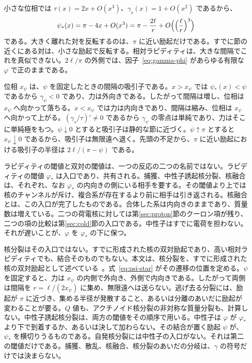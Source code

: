 \documentclass[a4paper]{article}
\begin{document}
小さな位相では \(\tau(x)=2x+O(x^{3})\)、\(\gamma_s(x)=1+O(x^{2})\) であるから、
\[
\psi_*(x)=\pi-4x+O(x^{3})=\pi-\frac{2\ell}{r}+O\Bigl(\Bigl(\frac{\ell}{r}\Bigr)^{3}\Bigr)
\]
である。大きく離れた対を反転するのは、\(\pi\) に近い励起だけである。すでに節の近くにある対は、小さな励起で反転する。相対ラピディティは、大きな間隔でこれを真似できない。\(2\ell/\pi\) の外側では、因子~\eqref{eq:gamma-phi} があらゆる有限な \(\varphi\) で正のままである。

位相 \(x_\psi\) は、\(\psi\) を固定したときの間隔の吸引子である。\(x>x_\psi\) では \(\psi_*(x)<\psi\) であるから \(\gamma_\psi<0\) であり、力は外向きである。したがって間隔は増し、位相は \(x_\psi\) へ向かって落ちる。\(x<x_\psi\) では力は内向きであり、間隔は縮み、位相は \(x_\psi\) へ向かって上がる。\((\gamma_s/\tau)'\neq 0\) であるから \(\gamma_\psi\) の零点は単純であり、力はそこに単純極をもつ。\(\psi\downarrow 0\) とすると吸引子は静的な節に近づく。\(\psi\uparrow\pi\) とすると \(x_\psi\downarrow 0\) であるから、吸引子は無限遠へ退く。先頭の不足から、\(\pi\) に近い励起における吸引子の半径は \(2\ell/(\pi-\psi)\) である。

ラピディティの閾値と双対の閾値は、一つの反応の二つの名前ではない。ラピディティの閾値 \(\varphi_*\) は入口であり、共有される。捕獲、中性子誘起核分裂、核融合は、それぞれ、なお \(\varphi_*\) の内向きの側にいる相手を要する。その閾値より上では核のチャンネルが斥け、複合系が存在するより前に相手は引き返される。核融合とは、この入口が完了したものである。合体した系は内向きのままであり、質量数は増えている。二つの荷電核に対しては第\ref{sec:proton}節のクーロン項が残り、二つの項の比較は第\ref{sec:cold}節の入口である。中性子はすでに電荷を担わない。それが遅いことが、\(\varphi\) を \(\varphi_*\) の下に保つ。

核分裂はその入口ではない。すでに形成された核の双対励起であり、高い相対ラピディティでも、結合そのものでもない。本文は、核分裂を、すでに形成された核の双対励起として述べている~\cite{dst-main}。式~\eqref{eq:psi-star} がその遷移の位置を定める。\(\psi\) を固定すると、力は \(x_\psi\) の内側で外向き、外側で内向きである。したがって両側は間隔を \(r=\ell/(2x_\psi)\) に集め、無限遠へは送らない。逃げ去る分裂には、励起が \(\pi\) に近づき、集める半径が発散すること、あるいは分離のあいだに励起が変わることが要る。\(Q\) 値も、アクチノイド核分裂の非対称な質量分裂も、計算しない。中性子誘起核分裂は、両方の閾値をその順序で用いる。中性子は \(\varphi\) が \(\varphi_*\) より下で到着するか、あるいは決して加わらない。その結合が置く励起 \(\psi\) が、\(\psi_*\) を横切りうるものである。自発核分裂には中性子の入口がない。それは第二の閾値だけである。捕獲、散乱、核融合、核分裂のあいだの分岐は、\(\gamma\) の符号だけでは決まらない。
\end{document}
